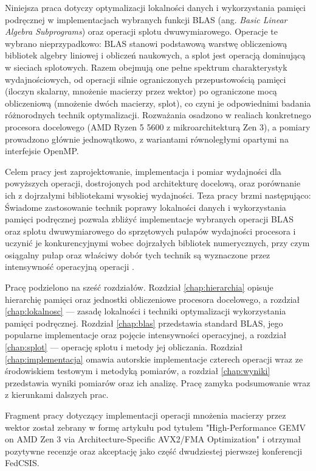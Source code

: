 \documentclass[a4paper,12pt]{book} %
\begin{document}
Niniejsza praca dotyczy optymalizacji lokalności danych i wykorzystania pamięci podręcznej w implementacjach wybranych funkcji BLAS (ang. \emph{Basic Linear Algebra Subprograms}) oraz operacji splotu dwuwymiarowego. Operacje te wybrano nieprzypadkowo: BLAS stanowi podstawową warstwę obliczeniową bibliotek algebry liniowej i obliczeń naukowych, a splot jest operacją dominującą w sieciach splotowych. Razem obejmują one pełne spektrum charakterystyk wydajnościowych, od operacji silnie ograniczonych przepustowością pamięci (iloczyn skalarny, mnożenie macierzy przez wektor) po ograniczone mocą obliczeniową (mnożenie dwóch macierzy, splot), co czyni je odpowiednimi badania różnorodnych technik optymalizacji. Rozważania osadzono w realiach konkretnego procesora docelowego (AMD Ryzen 5 5600 z mikroarchitekturą Zen 3), a pomiary prowadzono głównie jednowątkowo, z wariantami równoległymi opartymi na interfejsie OpenMP.

Celem pracy jest zaprojektowanie, implementacja i pomiar wydajności dla powyższych operacji, dostrojonych pod architekturę docelową, oraz porównanie ich z dojrzałymi bibliotekami wysokiej wydajności. Teza pracy brzmi następująco: Świadome zastosowanie technik poprawy lokalności danych i wykorzystania pamięci podręcznej pozwala zbliżyć implementacje wybranych operacji BLAS oraz splotu dwuwymiarowego do sprzętowych pułapów wydajności procesora i uczynić je konkurencyjnymi wobec dojrzałych bibliotek numerycznych, przy czym osiągalny pułap oraz właściwy dobór tych technik są wyznaczone przez intensywność operacyjną operacji \cite{williams2009roofline}.

Pracę podzielono na sześć rozdziałów. Rozdział \ref{chap:hierarchia} opisuje hierarchię pamięci oraz jednostki obliczeniowe procesora docelowego, a rozdział \ref{chap:lokalnosc} --- zasadę lokalności i techniki optymalizacji wykorzystania pamięci podręcznej. Rozdział \ref{chap:blas} przedstawia standard BLAS, jego popularne implementacje oraz pojęcie intensywności operacyjnej, a rozdział \ref{chap:splot} --- operację splotu i metody jej obliczania. Rozdział \ref{chap:implementacja} omawia autorskie implementacje czterech operacji wraz ze środowiskiem testowym i metodyką pomiarów, a rozdział \ref{chap:wyniki} przedstawia wyniki pomiarów oraz ich analizę. Pracę zamyka podsumowanie wraz z kierunkami dalszych prac.

Fragment pracy dotyczący implementacji operacji mnożenia macierzy przez wektor został zebrany w formę artykułu pod tytułem "High-Performance GEMV on AMD Zen 3 via Architecture-Specific AVX2/FMA Optimization" i otrzymał pozytywne recenzje oraz akceptację jako część dwudziestej pierwszej konferencji FedCSIS.
\end{document}
